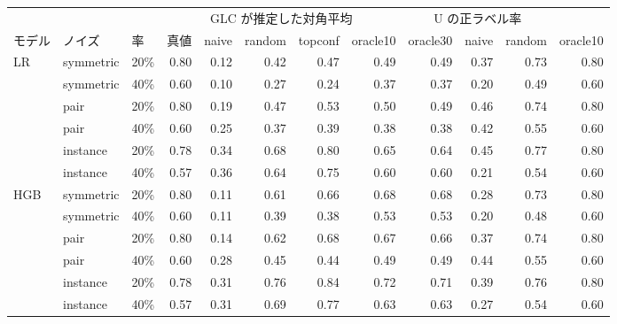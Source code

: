 \begin{tabular}{lllrrrrrrrrr}
\toprule
 & & & \multicolumn{5}{c}{GLC が推定した対角平均} & \multicolumn{3}{c}{U の正ラベル率} \\
\cmidrule(lr){4-8} \cmidrule(lr){9-11}
モデル & ノイズ & 率 & 真値 & naive & random & topconf & oracle10 & oracle30 & naive & random & oracle10 \\
\midrule
LR & symmetric & 20\% & 0.80 & 0.12 & 0.42 & 0.47 & 0.49 & 0.49 & 0.37 & 0.73 & 0.80 \\
 & symmetric & 40\% & 0.60 & 0.10 & 0.27 & 0.24 & 0.37 & 0.37 & 0.20 & 0.49 & 0.60 \\
 & pair & 20\% & 0.80 & 0.19 & 0.47 & 0.53 & 0.50 & 0.49 & 0.46 & 0.74 & 0.80 \\
 & pair & 40\% & 0.60 & 0.25 & 0.37 & 0.39 & 0.38 & 0.38 & 0.42 & 0.55 & 0.60 \\
 & instance & 20\% & 0.78 & 0.34 & 0.68 & 0.80 & 0.65 & 0.64 & 0.45 & 0.77 & 0.80 \\
 & instance & 40\% & 0.57 & 0.36 & 0.64 & 0.75 & 0.60 & 0.60 & 0.21 & 0.54 & 0.60 \\
\addlinespace
HGB & symmetric & 20\% & 0.80 & 0.11 & 0.61 & 0.66 & 0.68 & 0.68 & 0.28 & 0.73 & 0.80 \\
 & symmetric & 40\% & 0.60 & 0.11 & 0.39 & 0.38 & 0.53 & 0.53 & 0.20 & 0.48 & 0.60 \\
 & pair & 20\% & 0.80 & 0.14 & 0.62 & 0.68 & 0.67 & 0.66 & 0.37 & 0.74 & 0.80 \\
 & pair & 40\% & 0.60 & 0.28 & 0.45 & 0.44 & 0.49 & 0.49 & 0.44 & 0.55 & 0.60 \\
 & instance & 20\% & 0.78 & 0.31 & 0.76 & 0.84 & 0.72 & 0.71 & 0.39 & 0.76 & 0.80 \\
 & instance & 40\% & 0.57 & 0.31 & 0.69 & 0.77 & 0.63 & 0.63 & 0.27 & 0.54 & 0.60 \\
\bottomrule
\end{tabular}
